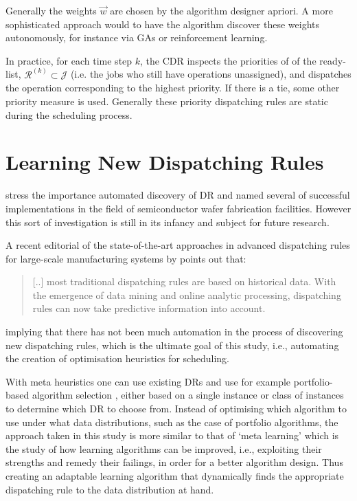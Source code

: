 \documentclass[smallextended]{svjour3}
\begin{document}
	Generally the weights $\vec{w}$ are chosen by the algorithm designer apriori. 
	A more sophisticated approach would to have the algorithm discover these weights autonomously, for instance via GAs or reinforcement learning. 
	
	In practice, for each time step $k$, the CDR inspects the priorities of of the ready-list, $\mathcal{R}^{(k)}\subset\mathcal{J}$ (i.e. the jobs who still have operations unassigned), and dispatches the operation corresponding to the highest priority. 
	If there is a tie, some other priority measure is used. Generally these priority dispatching rules are static during the scheduling process. 
	
	\section{Learning New Dispatching Rules}\label{ch:learningmodels}
	
	
	\cite{Monch13} stress the importance automated discovery of DR and named several of successful implementations in the field of semiconductor wafer fabrication facilities. However this sort of investigation is still in its infancy and subject for future research.
	
	A recent editorial of the state-of-the-art approaches in advanced dispatching rules for large-scale manufacturing systems by \citet{Chen13} points out that:
	\begin{quote}
		[..] most traditional dispatching rules are based on historical data. With the emergence of data mining and online analytic processing, dispatching rules can now take predictive information into account.
	\end{quote}
	implying that there has not been much automation in the process of discovering new dispatching rules, which is the ultimate goal of this study, i.e., automating the creation of optimisation heuristics for scheduling. 
	
	With meta heuristics one can use existing DRs and use for example portfolio-based algorithm selection \citep{Rice76,Gomes01}, either based on a single instance or class of instances \citep{Xu07} to determine which DR to choose from. 
	Instead of optimising which algorithm to use under what data distributions, such as the case of portfolio algorithms, the approach taken in this study is more similar to that of `meta learning' \citep{Vilalta02} which is the study of how learning algorithms can be improved, i.e., exploiting their strengths and remedy their failings, in order for a better algorithm design. Thus creating an adaptable learning algorithm that dynamically finds the appropriate dispatching rule  to the data distribution at hand. 
	
\end{document}
